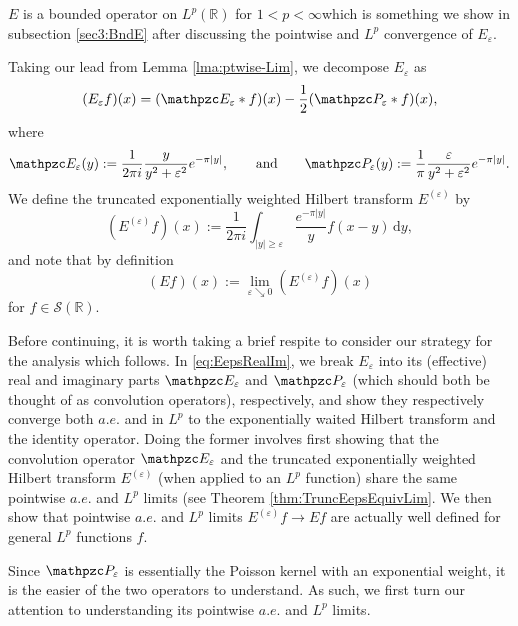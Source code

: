 \documentclass[../dissertation.tex]{subfiles}
\begin{document}
\begin{rmk}
	$E$ is a bounded operator on $L^p(\mathbb R)$ for $1 < p < \infty$\textemdash{}which 
	is something 
	we show in subsection \ref{sec3:BndE} after discussing the pointwise and $L^p$ 
	convergence of $E_\varepsilon$. 
\end{rmk}

Taking our lead from Lemma \ref{lma:ptwise-Lim}, we decompose $E_\varepsilon$ as  
\begin{align} \label{eq:EepsRealIm}
	(E_\varepsilon f)(x) 
		= (\mathpzc E_\varepsilon * f)(x) 
			- \frac{1}{2}(\mathpzc P_\varepsilon*f)(x),
\end{align}
where 
\[  \label{sym:badCauchy}
	\mathpzc E_\varepsilon(y) 
		:= \frac{1}{2\pi i} \frac{y}{y^2 + \varepsilon^2} e^{-\pi|y|}, 
	\qquad \text{and} \qquad
	\mathpzc P_\varepsilon(y) 
		:= \frac{1}{\pi} \frac{\varepsilon}{y^2 + \varepsilon^2} e^{-\pi|y|}.
\]
We define the truncated exponentially weighted Hilbert transform 
$E^{(\varepsilon)}$\label{sym:truncExpHil} by 
\[
	\left( E^{(\varepsilon)} f \right)(x) 
		:= \frac{1}{2\pi i} \int_{|y|\geq \varepsilon} \frac{e^{-\pi|y|}}{y} f(x - y) \, \mathrm{d}y,
\]
and note that by definition
\[
	(Ef)(x) 
		:= \lim_{\varepsilon \searrow 0} \left( E^{(\varepsilon)} f \right)(x)
\]
for $f \in \mathscr S(\mathbb R)$. 

\begin{rmk}
	Before continuing, it is worth taking a brief respite to consider our strategy for the 
	analysis which follows. In \eqref{eq:EepsRealIm}, we break $E_\varepsilon$ into its
	(ef{}fective) real and imaginary parts $\mathpzc E_{\varepsilon}$ and 
	$\mathpzc P_\varepsilon$
	(which should both be thought of as convolution operators), respectively, and show 
	they respectively converge both $a.e.$ and in $L^p$ to the exponentially waited 
	Hilbert transform and the identity operator. Doing the former involves first showing 
	that the convolution operator $\mathpzc E_{\varepsilon}$ and the truncated 
	exponentially weighted Hilbert transform $E^{(\varepsilon)}$ (when applied to an $L^p$ 
	function) share the same pointwise $a.e.$ and $L^p$ limits (see Theorem 
	\ref{thm:TruncEepsEquivLim}. We then show that pointwise $a.e.$ and $L^p$ 
	limits $E^{(\varepsilon)}f \to Ef$ are actually well defined for general $L^p$ 
	functions $f$.
\end{rmk}

Since $\mathpzc P_\varepsilon$ is essentially the Poisson kernel with an exponential weight, it 
is the easier of the two operators to understand. As such, we first turn our attention 
to understanding its pointwise $a.e.$ and $L^p$ limits.
\end{document}
